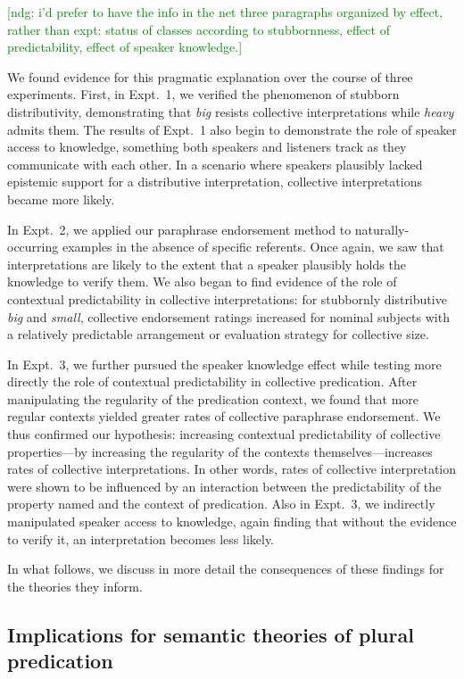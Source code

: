 \documentclass[linguex]{sp}
\newcommand{\ndg}[1]{\textcolor{Green}{[ndg: #1]}}
\begin{document}
\ndg{i'd prefer to have the info in the net three paragraphs organized by effect, rather than expt: status of classes according to stubbornness, effect of predictability, effect of speaker knowledge.}

We found evidence for this pragmatic explanation over the course of three experiments. First, in Expt.~1, we verified the phenomenon of stubborn distributivity, demonstrating that \emph{big} resists collective interpretations while \emph{heavy} admits them. The results of Expt.~1 also begin to demonstrate the role of speaker access to knowledge, something both speakers and listeners track as they communicate with each other. In a scenario where speakers plausibly lacked epistemic support for a distributive interpretation, collective interpretations became more likely.

In Expt.~2, we applied our paraphrase endorsement method to naturally-occurring examples in the absence of specific referents. Once again, we saw that interpretations are likely to the extent that a speaker plausibly holds the knowledge to verify them. We also began to find evidence of the role of contextual predictability in collective interpretations: for stubbornly distributive \emph{big} and \emph{small}, collective endorsement ratings increased for nominal subjects with a relatively predictable arrangement or evaluation strategy for collective size.

In Expt.~3, we further pursued the speaker knowledge effect while testing more directly the role of contextual predictability in collective predication. After manipulating the regularity of the predication context, we found that more regular contexts yielded greater rates of collective paraphrase endorsement. We thus confirmed our hypothesis: increasing contextual predictability of collective properties---by increasing the regularity of the contexts themselves---increases rates of collective interpretations. In other words, rates of collective interpretation were shown to be influenced by an interaction between the predictability of the property named and the context of predication. Also in Expt.~3, we indirectly manipulated speaker access to knowledge, again finding that without the evidence to verify it, an interpretation becomes less likely.


In what follows, we discuss in more detail the consequences of these findings for the theories they inform.

\subsection{Implications for semantic theories of plural predication}
\end{document}
